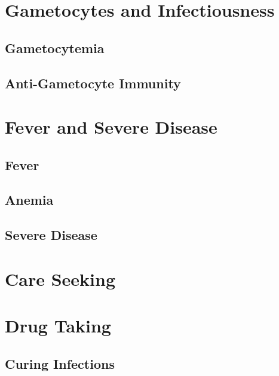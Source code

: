 \documentclass[
]{book}
\begin{document}
\hypertarget{gametocytes-and-infectiousness}{%
\chapter{Gametocytes and Infectiousness}\label{gametocytes-and-infectiousness}}

\hypertarget{gametocytemia}{%
\section{Gametocytemia}\label{gametocytemia}}

\hypertarget{anti-gametocyte-immunity}{%
\section{Anti-Gametocyte Immunity}\label{anti-gametocyte-immunity}}

\hypertarget{fever-and-severe-disease}{%
\chapter{Fever and Severe Disease}\label{fever-and-severe-disease}}

\hypertarget{fever}{%
\section{Fever}\label{fever}}

\hypertarget{anemia}{%
\section{Anemia}\label{anemia}}

\hypertarget{severe-disease}{%
\section{Severe Disease}\label{severe-disease}}

\hypertarget{care-seeking}{%
\chapter{Care Seeking}\label{care-seeking}}

\hypertarget{drug-taking}{%
\chapter{Drug Taking}\label{drug-taking}}

\hypertarget{curing-infections}{%
\section{Curing Infections}\label{curing-infections}}
\end{document}
